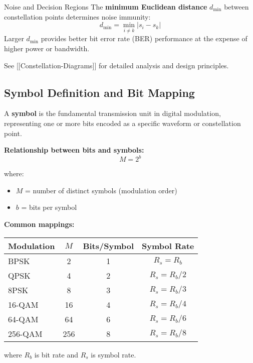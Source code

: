 \begin{calloutbox}{Noise and Decision Regions}
The \textbf{minimum Euclidean distance} $d_{\text{min}}$ between constellation points determines noise immunity:
\begin{equation}
d_{\text{min}} = \min_{i \neq k} |s_i - s_k|
\end{equation}
Larger $d_{\text{min}}$ provides better bit error rate (BER) performance at the expense of higher power or bandwidth.
\end{calloutbox}

See {[}{[}Constellation-Diagrams{]}{]} for detailed analysis and design principles.

\subsection{Symbol Definition and Bit Mapping}

A \textbf{symbol} is the fundamental transmission unit in digital modulation, representing one or more bits encoded as a specific waveform or constellation point.

\textbf{Relationship between bits and symbols:}
\begin{equation}
M = 2^b
\label{eq:symbol_order}
\end{equation}

where:
\begin{itemize}
\item $M$ = number of distinct symbols (modulation order)
\item $b$ = bits per symbol
\end{itemize}

\textbf{Common mappings:}
\begin{center}
\begin{tabular}{lccc}
\toprule
\textbf{Modulation} & \textbf{$M$} & \textbf{Bits/Symbol} & \textbf{Symbol Rate} \\
\midrule
BPSK & 2 & 1 & $R_s = R_b$ \\
QPSK & 4 & 2 & $R_s = R_b/2$ \\
8PSK & 8 & 3 & $R_s = R_b/3$ \\
16-QAM & 16 & 4 & $R_s = R_b/4$ \\
64-QAM & 64 & 6 & $R_s = R_b/6$ \\
256-QAM & 256 & 8 & $R_s = R_b/8$ \\
\bottomrule
\end{tabular}
\end{center}

where $R_b$ is bit rate and $R_s$ is symbol rate.

